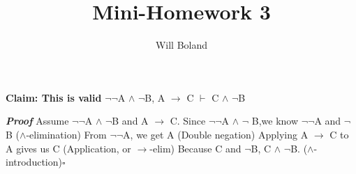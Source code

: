 \documentclass{article}
\begin{document}
\title{Mini-Homework 3}
\author{Will Boland}
\maketitle

\textbf{Claim: This is valid}\newline
$\neg$$\neg$A $\wedge$ $\neg$B, A $\rightarrow$ C $\vdash$ C $\wedge$ $\neg$B\newline\newline

\textbf{\textit{Proof}}\newline
Assume $\neg$$\neg$A $\wedge$ $\neg$B and A $\rightarrow$ C.\newline
Since $\neg$$\neg$A $\wedge$ $\neg$ B,we know $\neg$$\neg$A and $\neg$B ($\wedge$-elimination)\newline
From $\neg$$\neg$A, we get A (Double negation)\newline
Applying A $\rightarrow$ C to A gives us C (Application, or $\rightarrow$-elim)\newline
Because C and $\neg$B, C $\wedge$ $\neg$B. ($\wedge$-introduction)$\square$
\end{document}
